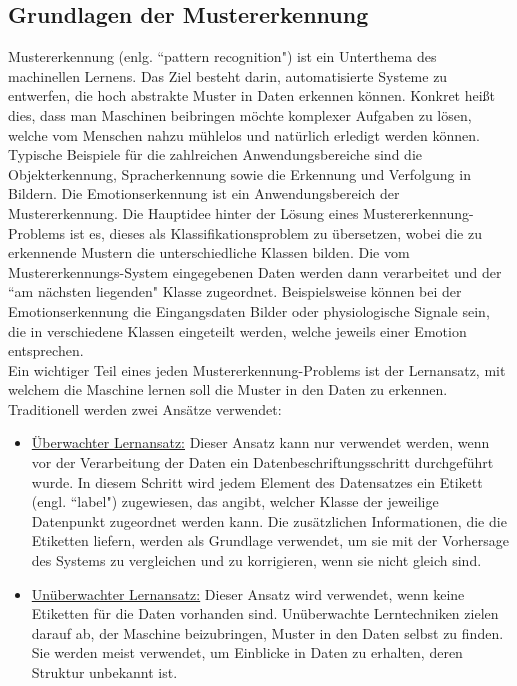 \subsection{Grundlagen der Mustererkennung} \label{grundlagen-mustererkennung}


Mustererkennung (enlg. ``pattern recognition") ist ein Unterthema des machinellen Lernens.
Das Ziel besteht darin, automatisierte Systeme zu entwerfen, die hoch abstrakte Muster in Daten erkennen können.
Konkret heißt dies, dass man Maschinen beibringen möchte komplexer Aufgaben zu lösen, welche vom Menschen nahzu mühlelos und natürlich erledigt werden können.
Typische Beispiele für die zahlreichen Anwendungsbereiche sind die Objekterkennung, Spracherkennung sowie die Erkennung und Verfolgung in Bildern. 
Die Emotionserkennung ist ein Anwendungsbereich der Mustererkennung.
Die Hauptidee hinter der Lösung eines Mustererkennung-Problems ist es, dieses als Klassifikationsproblem zu übersetzen, wobei die zu erkennende Mustern die unterschiedliche Klassen bilden. 
Die vom Mustererkennungs-System eingegebenen Daten werden dann verarbeitet und der ``am nächsten liegenden" Klasse zugeordnet.
Beispielsweise können bei der Emotionserkennung die Eingangsdaten Bilder oder physiologische Signale sein, die in verschiedene Klassen eingeteilt werden, welche jeweils einer Emotion entsprechen. \\

Ein wichtiger Teil eines jeden Mustererkennung-Problems ist der Lernansatz, mit welchem die Maschine lernen soll die Muster in den Daten zu erkennen. 
Traditionell werden zwei Ansätze verwendet:

\begin{itemize}%
  \item \underline{Überwachter Lernansatz:}
  Dieser Ansatz kann nur verwendet werden, wenn vor der Verarbeitung der Daten ein Datenbeschriftungsschritt durchgeführt wurde.
  In diesem Schritt wird jedem Element des Datensatzes ein Etikett (engl. ``label") zugewiesen, das angibt, welcher Klasse der jeweilige Datenpunkt zugeordnet werden kann.
  Die zusätzlichen Informationen, die die Etiketten liefern, werden als Grundlage verwendet, um sie mit der Vorhersage des Systems zu vergleichen und zu korrigieren, wenn sie nicht gleich sind.

  \item \underline{Unüberwachter Lernansatz:}
  Dieser Ansatz wird verwendet, wenn keine Etiketten für die Daten vorhanden sind.
  Unüberwachte Lerntechniken zielen darauf ab, der Maschine beizubringen, Muster in den Daten selbst zu finden. 
  Sie werden meist verwendet, um Einblicke in Daten zu erhalten, deren Struktur unbekannt ist.
\end{itemize} %


